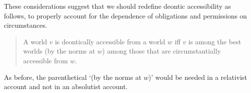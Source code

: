 %
%
%

These considerations suggest that we should redefine deontic accessibility as
follows, to properly account for the dependence of obligations and permissions
on circumstances.

\begin{quote}
  A world $v$ is deontically accessible from a world $w$ iff $v$ is among the
  best worlds (by the norms at $w$) among those that are circumstantially
  accessible from $w$.
\end{quote}
%
As before, the parenthetical `(by the norms at $w$)' would be needed in a
relativist account and not in an absolutist account.

